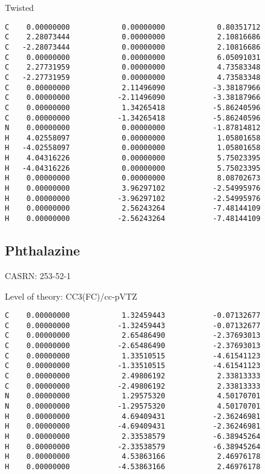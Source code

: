 \documentclass[journal=jctcce,manuscript=article,layout=traditional]{achemso}
\newcommand{\TZ}{cc-pVTZ}
\begin{document}
\begin{singlespace}
\noindent Twisted
\begin{verbatim}
C    0.00000000            0.00000000            0.80351712
C    2.28073444            0.00000000            2.10816686
C   -2.28073444            0.00000000            2.10816686
C    0.00000000            0.00000000            6.05091031
C    2.27731959            0.00000000            4.73583348
C   -2.27731959            0.00000000            4.73583348
C    0.00000000            2.11496090           -3.38187966
C    0.00000000           -2.11496090           -3.38187966
C    0.00000000            1.34265418           -5.86240596
C    0.00000000           -1.34265418           -5.86240596
N    0.00000000            0.00000000           -1.87814812
H    4.02558097            0.00000000            1.05801658
H   -4.02558097            0.00000000            1.05801658
H    4.04316226            0.00000000            5.75023395
H   -4.04316226            0.00000000            5.75023395
H    0.00000000            0.00000000            8.08702673
H    0.00000000            3.96297102           -2.54995976
H    0.00000000           -3.96297102           -2.54995976
H    0.00000000            2.56243264           -7.48144109
H    0.00000000           -2.56243264           -7.48144109
\end{verbatim}
\end{singlespace}

\subsection{Phthalazine}

CASRN:  	253-52-1

\begin{singlespace}
\noindent Level of theory: CC3(FC)/{\TZ}
\begin{verbatim}
C    0.00000000            1.32459443           -0.07132677
C    0.00000000           -1.32459443           -0.07132677
C    0.00000000            2.65486490           -2.37693013
C    0.00000000           -2.65486490           -2.37693013
C    0.00000000            1.33510515           -4.61541123
C    0.00000000           -1.33510515           -4.61541123
C    0.00000000            2.49806192            2.33813333
C    0.00000000           -2.49806192            2.33813333
N    0.00000000            1.29575320            4.50170701
N    0.00000000           -1.29575320            4.50170701
H    0.00000000            4.69409431           -2.36246981
H    0.00000000           -4.69409431           -2.36246981
H    0.00000000            2.33538579           -6.38945264
H    0.00000000           -2.33538579           -6.38945264
H    0.00000000            4.53863166            2.46976178
H    0.00000000           -4.53863166            2.46976178
\end{verbatim}
\end{singlespace}
\end{document}
